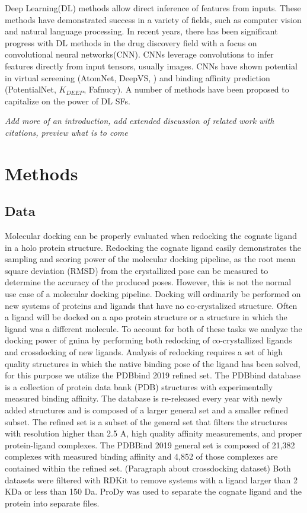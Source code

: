\documentclass[journal=jcisd8,manuscript=article]{achemso}
\begin{document}
Deep Learning(DL) methods allow direct inference of features from inputs. These methods have demonstrated success in a variety of fields, such as computer vision and natural language processing. In recent years, there has been significant progress with DL methods in the drug discovery field with a focus on convolutional neural networks(CNN). CNNs leverage convolutions to infer features directly from input tensors, usually images. CNNs have shown potential in virtual screening (AtomNet, DeepVS, \cite{Ragoza2017}) and binding affinity prediction (PotentialNet, $K_{DEEP}$, Fafnucy). A number of methods have been proposed to capitalize on the power of DL SFs. 

\textit{Add more of an introduction, add extended discussion of related work with citations, preview what is to come}

\section{Methods}


\subsection{Data}
Molecular docking can be properly evaluated when redocking the cognate ligand in a holo protein structure. Redocking the cognate ligand easily demonstrates the sampling and scoring power of the molecular docking pipeline, as the root mean square deviation (RMSD) from the crystallized pose can be measured to determine the accuracy of the produced poses. However, this is not the normal use case of a molecular docking pipeline.  Docking will ordinarily be performed on new systems of proteins and ligands that have no co-crystalized structure. Often a ligand will be docked on a apo protein structure or a structure in which the ligand was a different molecule. To account for both of these tasks we analyze the docking power of gnina by performing both redocking of co-crystallized ligands and crossdocking of new ligands. 
Analysis of redocking requires a set of high quality structures in which the native binding pose of the ligand has been solved, for this purpose we utilize the PDBbind 2019 refined set. The PDBbind database is a collection of protein data bank (PDB) structures with experimentally measured binding affinity. The database is re-released every year with newly added structures and is composed of a larger general set and a smaller refined subset. The refined set is a subset of the general set that filters the structures with resolution higher than 2.5 A, high quality affinity measurements, and proper protein-ligand complexes.  The PDBBind 2019 general set is composed of 21,382 complexes with measured binding affinity and 4,852 of those complexes are contained within the refined set.
(Paragraph about crossdocking dataset)
Both datasets were filtered with RDKit to remove systems with a ligand larger than 2 KDa or less than 150 Da. ProDy was used to separate the cognate ligand and the protein into separate files.
\end{document}
